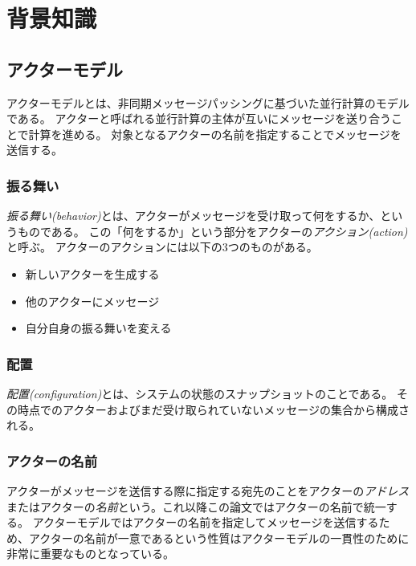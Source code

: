 \chapter{背景知識}
\label{chapter:background}

\section{アクターモデル}

アクターモデル\cite{Agha:1986aa}とは、非同期メッセージパッシングに基づいた並行計算のモデルである。
アクターと呼ばれる並行計算の主体が互いにメッセージを送り合うことで計算を進める。
対象となるアクターの名前を指定することでメッセージを送信する。


\subsection{振る舞い}

\emph{振る舞い(behavior)}とは、アクターがメッセージを受け取って何をするか、というものである。
この「何をするか」という部分をアクターの\emph{アクション(action)}と呼ぶ。
アクターのアクションには以下の3つのものがある。

\begin{itemize}
\item 新しいアクターを生成する
\item 他のアクターにメッセージ
\item 自分自身の振る舞いを変える
\end{itemize}


\subsection{配置}

\emph{配置(configuration)}とは、システムの状態のスナップショットのことである。
その時点でのアクターおよびまだ受け取られていないメッセージの集合から構成される。

\subsection{アクターの名前}

アクターがメッセージを送信する際に指定する宛先のことをアクターの\emph{アドレス}またはアクターの\emph{名前}という。これ以降この論文ではアクターの名前で統一する。
アクターモデルではアクターの名前を指定してメッセージを送信するため、アクターの名前が一意であるという性質はアクターモデルの一貫性のために非常に重要なものとなっている。

